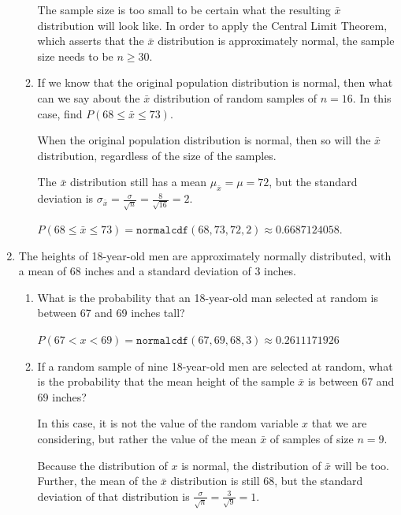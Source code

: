 \documentclass[11pt]{article}
\newcommand{\answer}[1]{\color{white}#1}
\begin{document}
\begin{enumerate}
\begin{enumerate}
	{\answer The sample size is too small to be certain what the resulting $\bar{x}$ distribution will look like.  In order to apply the Central Limit Theorem, which asserts that the $\bar{x}$ distribution is approximately normal, the sample size needs to be $n \geq 30$.
	} 

	\item If we know that the original population distribution is normal, then what can we say about the $\bar x$ distribution of random samples of $n=16$.  In this case, find $P(68 \leq \bar x \leq 73)$. 
	
	{\answer When the original population distribution is normal, then so will the $\bar{x}$ distribution, regardless of the size of the samples. 
	
	The $\bar{x}$ distribution still has a mean $\mu_{\bar{x}} = \mu = 72$, but the standard deviation is $\sigma_{\bar{x}} = \frac{\sigma}{\sqrt{n}} =\frac{8}{\sqrt{16}} = 2$. 
	
	$P(68 \leq \bar{x} \leq 73) = \texttt{normalcdf}(68, 73, 72, 2) \approx 0.6687124058$.
	} 
	
	\end{enumerate}
	
\item The heights of 18-year-old men are approximately normally distributed, with a mean of 68 inches and a standard deviation of 3 inches.

	\begin{enumerate}
	
	\item What is the probability that an 18-year-old man selected at random is between 67 and 69 inches tall? 
	
	{\answer $P(67 < x < 69) = \texttt{normalcdf}(67, 69, 68, 3) \approx 0.2611171926$
	} 

	\item If a random sample of nine 18-year-old men are selected at random, what is the probability that the mean height of the sample $\bar x$ is between 67 and 69 inches? 
	
	{\answer  In this case, it is not the value of the random variable $x$ that we are considering, but rather the value of the mean $\bar{x}$ of samples of size $n = 9$.  
	
	Because the distribution of $x$ is normal, the distribution of $\bar{x}$ will be too.  Further, the mean of the $\bar{x}$ distribution is still 68, but the standard deviation of that distribution is $\frac{\sigma}{\sqrt{n}} = \frac{3}{\sqrt{9}} = 1$. 
	
}
\end{enumerate}
\end{enumerate}
\end{document}
